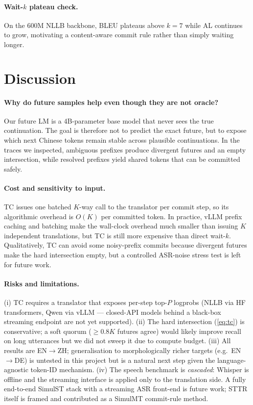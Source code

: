 \documentclass{article}
\begin{document}
\paragraph{Wait-$k$ plateau check.}
On the 600M NLLB backbone, BLEU plateaus above $k{=}7$ while AL continues to grow, motivating a
content-aware commit rule rather than simply waiting longer.

\section{Discussion}
\label{sec:discussion}

\paragraph{Why do future samples help even though they are not oracle?} Our future LM is a
4B-parameter base model that never sees the true continuation. The goal is therefore not to
predict the exact future, but to expose which next Chinese tokens remain stable across plausible
continuations. In the traces we inspected, ambiguous prefixes produce divergent futures and an
empty intersection, while resolved prefixes yield shared tokens that can be committed safely.

\paragraph{Cost and sensitivity to input.} TC issues one batched $K$-way call to the translator per
commit step, so its algorithmic overhead is $O(K)$ per committed token. In practice, vLLM prefix
caching and batching make the wall-clock overhead much smaller than issuing $K$ independent
translations, but TC is still more expensive than direct wait-$k$. Qualitatively, TC can avoid
some noisy-prefix commits because divergent futures make the hard intersection empty, but a
controlled ASR-noise stress test is left for future work.

\paragraph{Risks and limitations.}
(i) TC requires a translator that exposes per-step top-$P$ logprobs (NLLB via HF transformers,
Qwen via vLLM --- closed-API models behind a black-box streaming endpoint are not yet
supported).
(ii) The hard intersection (\ref{eq:tc}) is conservative; a soft quorum
($\geq 0.8K$ futures agree) would likely improve recall on long utterances but we did not sweep it
due to compute budget.
(iii) All results are EN$\rightarrow$ZH; generalisation to morphologically richer targets (e.g.\
EN$\rightarrow$DE) is untested in this project but is a natural next step given the
language-agnostic token-ID mechanism.
(iv) The speech benchmark is \emph{cascaded}: Whisper is offline and the streaming interface is
applied only to the translation side. A fully end-to-end SimulST stack with a streaming ASR
front-end is future work; STTR itself is framed and contributed as a SimulMT commit-rule method.
\end{document}
